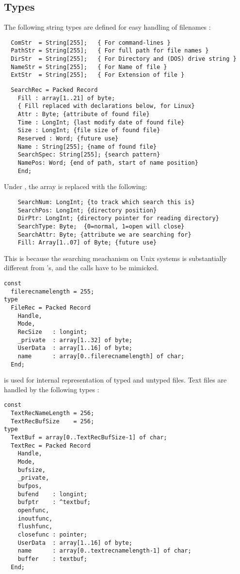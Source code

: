 \subsection{Types}
The following string types are defined for easy handling of
filenames :
\begin{verbatim}
  ComStr  = String[255];   { For command-lines } 
  PathStr = String[255];   { For full path for file names }
  DirStr  = String[255];   { For Directory and (DOS) drive string }
  NameStr = String[255];   { For Name of file }
  ExtStr  = String[255];   { For Extension of file }
\end{verbatim}
\begin{verbatim}
  SearchRec = Packed Record
    Fill : array[1..21] of byte;  
    { Fill replaced with declarations below, for Linux}
    Attr : Byte; {attribute of found file}
    Time : LongInt; {last modify date of found file}
    Size : LongInt; {file size of found file}
    Reserved : Word; {future use}
    Name : String[255]; {name of found file}
    SearchSpec: String[255]; {search pattern}
    NamePos: Word; {end of path, start of name position}
    End;
\end{verbatim}
Under \linux, the  array is replaced with the following:
\begin{verbatim}
    SearchNum: LongInt; {to track which search this is}
    SearchPos: LongInt; {directory position}
    DirPtr: LongInt; {directory pointer for reading directory}
    SearchType: Byte;  {0=normal, 1=open will close}
    SearchAttr: Byte; {attribute we are searching for}
    Fill: Array[1..07] of Byte; {future use}
\end{verbatim}
This is because the searching meachanism on Unix systems is substantially
different from \dos's, and the calls have to be mimicked.
\begin{verbatim}
const
  filerecnamelength = 255;
type
  FileRec = Packed Record
    Handle,
    Mode,  
    RecSize   : longint;
    _private  : array[1..32] of byte;
    UserData  : array[1..16] of byte;
    name      : array[0..filerecnamelength] of char;
  End;
\end{verbatim}
 is used for internal representation of typed and untyped files.
Text files are handled by the following types :
\begin{verbatim}
const
  TextRecNameLength = 256;
  TextRecBufSize    = 256;
type
  TextBuf = array[0..TextRecBufSize-1] of char;
  TextRec = Packed Record
    Handle,
    Mode,  
    bufsize,
    _private,
    bufpos,  
    bufend    : longint;
    bufptr    : ^textbuf;
    openfunc,
    inoutfunc,
    flushfunc,
    closefunc : pointer;
    UserData  : array[1..16] of byte;
    name      : array[0..textrecnamelength-1] of char;
    buffer    : textbuf;
  End;
\end{verbatim}
